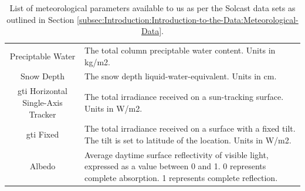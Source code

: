 \begin{table}[hbt!]
\begin{adjustwidth*}{-3.0cm}{-3.0cm}
\begin{tabularx}{\linewidth}{cX}
                        Preciptable Water                        & The total column preciptable water content. Units in kg/m2.                                                                                                                                                                                               \\
                        Snow Depth                               & The snow depth liquid-water-equivalent. Units in cm.                                                                                                                                                                                                      \\
                        \gls{gti} Horizontal Single-Axis Tracker & The total irradiance received on a sun-tracking surface.  Units in W/m2.                                                                                                                                                                                  \\
                        \gls{gti} Fixed                          & The total irradiance received on a surface with a fixed tilt. The tilt is set to latitude of the location.  Units in W/m2.                                                                                                                                \\
                        Albedo                                   & Average daytime surface reflectivity of visible light, expressed as a value between 0 and 1. 0 represents complete absorption. 1 represents complete reflection.                                                                                          \\ \bottomrule
                \end{tabularx}
                \caption{List of meteorological parameters available to us as per the Solcast data sets as outlined in Section \ref{subsec:Introduction:Introduction-to-the-Data:Meteorological-Data}.}
                \label{tab:Solcast-parameters}
        \end{adjustwidth*}
\end{table}